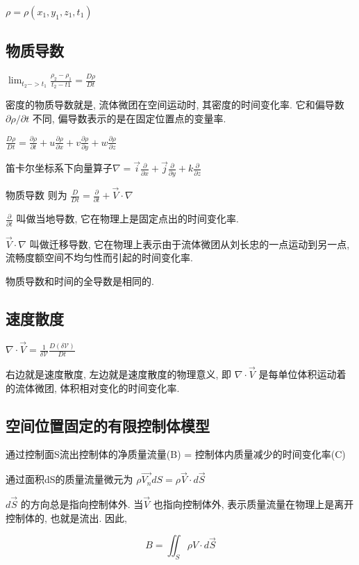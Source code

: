 \documentclass[UTF8]{ctexart}
\begin{document}
$\rho = \rho (x_1, y_1, z_1, t_1)$

\subsection{物质导数}

$\lim _{t_2 -> t_1} \frac{\rho_2 - \rho_1}{t_2 - t1} = \frac{D\rho}{Dt}$

密度的物质导数就是, 流体微团在空间运动时, 其密度的时间变化率.  它和偏导数$\partial \rho / \partial t$ 不同, 偏导数表示的是在固定位置点的变量率.

$\frac{D\rho}{Dt} = \frac{\partial \rho}{\partial t} + u \frac{\partial \rho}{\partial x} + v \frac{\partial \rho}{\partial y} + w \frac{\partial \rho}{\partial z}$

笛卡尔坐标系下向量算子$\nabla = \vec{i} \frac{\partial}{\partial x} + \vec{j} \frac{\partial}{\partial y} + k \frac{\partial}{ \partial z}$

物质导数 则为 $\frac{D}{Dt} = \frac{\partial}{\partial t} + \vec{V} \cdot \nabla$

$\frac{\partial}{\partial t}$ 叫做当地导数, 它在物理上是固定点出的时间变化率.

$\vec{V} \cdot \nabla$ 叫做迁移导数, 它在物理上表示由于流体微团从刘长忠的一点运动到另一点, 流畅度额空间不均匀性而引起的时间变化率.

物质导数和时间的全导数是相同的.

\subsection{速度散度}

$\nabla \cdot \vec{V} = \frac{1}{\delta \mathcal{V} } \frac{D(\delta \mathcal{V})}{Dt}$

右边就是速度散度, 左边就是速度散度的物理意义, 即 $\nabla \cdot \vec{V}$ 是每单位体积运动着的流体微团, 体积相对变化的时间变化率.

\subsection{空间位置固定的有限控制体模型}
通过控制面S流出控制体的净质量流量(B) = 控制体内质量减少的时间变化率(C)

通过面积dS的质量流量微元为 $\rho \vec{V_n} dS = \rho \vec{V} \cdot d\vec{S}$

$d \vec{S}$ 的方向总是指向控制体外. 当$\vec{V}$ 也指向控制体外, 表示质量流量在物理上是离开控制体的, 也就是流出. 因此,

$$
	B = \iint_{S} \rho V \cdot d\vec{S}
$$
\end{document}
